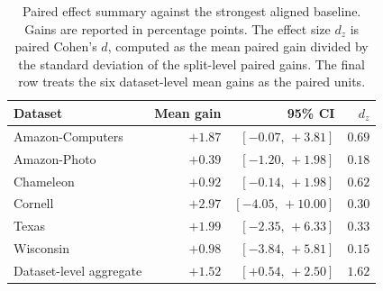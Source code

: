 \begin{table}[t]
\centering
\footnotesize
\caption{
Paired effect summary against the strongest aligned baseline. Gains are
reported in percentage points. The effect size $d_z$ is paired Cohen's $d$,
computed as the mean paired gain divided by the standard deviation of the
split-level paired gains. The final row treats the six dataset-level mean
gains as the paired units.
}
\label{tab:paired-effect}
\begin{tabular}{lrrr}
\toprule
Dataset & Mean gain & 95\% CI & $d_z$ \\
\midrule
Amazon-Computers & $+1.87$ & $[-0.07,\,+3.81]$ & $0.69$ \\
Amazon-Photo     & $+0.39$ & $[-1.20,\,+1.98]$ & $0.18$ \\
Chameleon        & $+0.92$ & $[-0.14,\,+1.98]$ & $0.62$ \\
Cornell          & $+2.97$ & $[-4.05,\,+10.00]$ & $0.30$ \\
Texas            & $+1.99$ & $[-2.35,\,+6.33]$ & $0.33$ \\
Wisconsin        & $+0.98$ & $[-3.84,\,+5.81]$ & $0.15$ \\
\midrule
Dataset-level aggregate & $+1.52$ & $[+0.54,\,+2.50]$ & $1.62$ \\
\bottomrule
\end{tabular}
\end{table}
